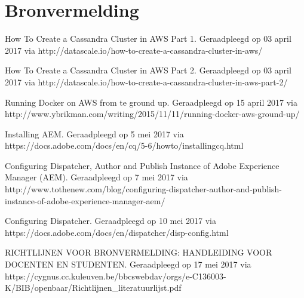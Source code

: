 \documentclass{article}
\begin{document}
	\section{Bronvermelding}
	
How To Create a Cassandra Cluster in AWS Part 1.
Geraadpleegd op 03 april 2017 via
http://datascale.io/how-to-create-a-cassandra-cluster-in-aws/
\par
How To Create a Cassandra Cluster in AWS Part 2. 
Geraadpleegd op 03 april 2017 via 
http://datascale.io/how-to-create-a-cassandra-cluster-in-aws-part-2/
\par
Running Docker on AWS from te ground up. 
Geraadpleegd op 15 april 2017 via 
http://www.ybrikman.com/writing/2015/11/11/running-docker-aws-ground-up/
\par
Installing AEM.
Geraadpleegd op 5 mei 2017 via 
https://docs.adobe.com/docs/en/cq/5-6/howto/installingcq.html
\par
Configuring Dispatcher, Author and Publish Instance of Adobe Experience Manager (AEM).
Geraadpleegd op 7 mei 2017 via 
http://www.tothenew.com/blog/configuring-dispatcher-author-and-publish-instance-of-adobe-experience-manager-aem/
\par
Configuring Dispatcher. 
Geraadpleegd op 10 mei 2017 via 
https://docs.adobe.com/docs/en/dispatcher/disp-config.html 
\par
RICHTLIJNEN VOOR BRONVERMELDING: HANDLEIDING VOOR DOCENTEN EN STUDENTEN. 
Geraadpleegd op 17 mei 2017 via 
https://cygnus.cc.kuleuven.be/bbcswebdav/orgs/e-C136003-K/BIB/openbaar/Richtlijnen\_literatuurlijst.pdf
\end{document}
